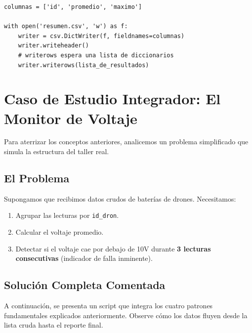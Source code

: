 \documentclass[11pt, a4paper]{article}
\begin{document}
\begin{lstlisting}[caption={Escritura de diccionarios a CSV}]
columnas = ['id', 'promedio', 'maximo']

with open('resumen.csv', 'w') as f:
    writer = csv.DictWriter(f, fieldnames=columnas)
    writer.writeheader()
    # writerows espera una lista de diccionarios
    writer.writerows(lista_de_resultados)
\end{lstlisting}

\newpage

\section{Caso de Estudio Integrador: El Monitor de Voltaje}

Para aterrizar los conceptos anteriores, analicemos un problema simplificado que simula la estructura del taller real.

\subsection{El Problema}
Supongamos que recibimos datos crudos de baterías de drones. Necesitamos:
\begin{enumerate}
    \item Agrupar las lecturas por \texttt{id\_dron}.
    \item Calcular el voltaje promedio.
    \item Detectar si el voltaje cae por debajo de 10V durante \textbf{3 lecturas consecutivas} (indicador de falla inminente).
\end{enumerate}

\subsection{Solución Completa Comentada}
A continuación, se presenta un script que integra los cuatro patrones fundamentales explicados anteriormente. Observe cómo los datos fluyen desde la lista cruda hasta el reporte final.
\end{document}
